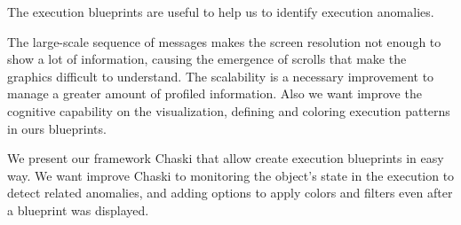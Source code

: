 \documentclass{sig-alternate}
\begin{document}
The execution blueprints are useful to help us to identify execution anomalies.

The large-scale sequence of messages makes the screen resolution not enough to show a lot of information, causing the emergence of scrolls that make the graphics difficult to understand. The scalability is a necessary improvement to manage a greater amount of profiled information. Also we want improve the cognitive capability on the visualization, defining and coloring execution patterns in ours blueprints.

We present our framework Chaski that allow create execution blueprints in easy way. We want improve Chaski to monitoring the object's state in the execution to detect related anomalies, and adding options to apply colors and filters even after a blueprint was displayed. 




\end{document}
